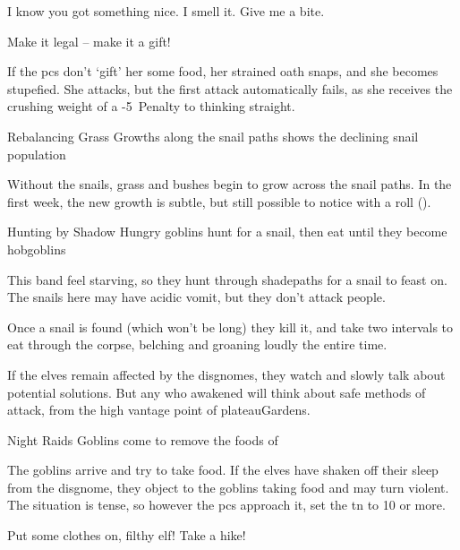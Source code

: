 \begin{multicols}{2}
\begin{speechtext}
  I know you got something nice.
  I smell it.
  Give me a bite.

  Make it legal -- make it a gift!
\end{speechtext}

If the \glspl{pc} don't `gift' her some food, her strained oath snaps, and she becomes stupefied.
She attacks, but the first attack automatically fails, as she receives the crushing weight of a -5~Penalty to thinking straight.

%

{Rebalancing Grass}%
{Growths along the snail paths shows the declining snail population}%

Without the snails, grass and bushes begin to grow across the snail paths.
In the first week, the new growth is subtle, but still possible to notice with a  roll (\tn[12]).

{Hunting by Shadow}%
{Hungry goblins hunt for a snail, then eat until they become hobgoblins}%

This band feel starving, so they hunt through \gls{shadepaths} for a snail to feast on.
The snails here may have acidic vomit, but they don't attack people.

Once a snail is found (which won't be long) they kill it, and take two \glspl{interval} to eat through the corpse, belching and groaning loudly the entire time.

If the elves remain affected by the \glspl{disgnome}, they watch and slowly talk about potential solutions.
But any who awakened will think about safe methods of attack, from the high vantage point of \gls{plateauGardens}.

{Night Raids}%
{Goblins come to remove the foods of }%

The goblins arrive and try to take food.
If the elves have shaken off their sleep from the \gls{disgnome}, they object to the goblins taking food and may turn violent.
The situation is tense, so however the \glspl{pc} approach it, set the \gls{tn} to 10 or more.


\begin{boxtext}
  Put some clothes on, filthy elf!
  Take a hike!
\end{boxtext}


\end{multicols}

